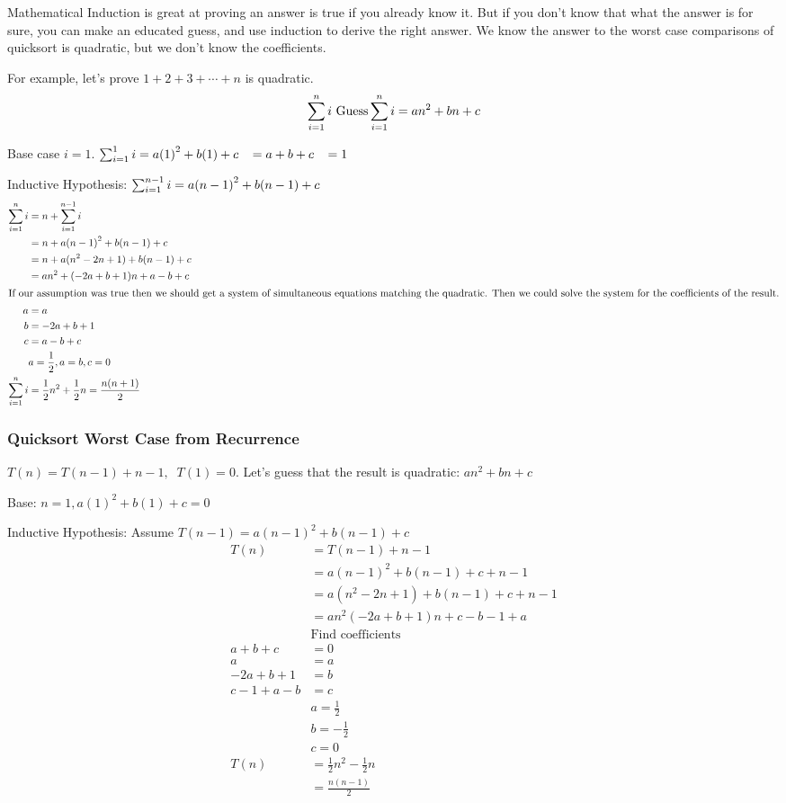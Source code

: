 \documentclass[english, 10pt]{article}
\begin{document}
Mathematical Induction is great at proving an answer is true if you already
know it. But if you don't know that what the answer is for sure, you can make
an educated guess, and use induction to derive the right answer. We know the
answer to the worst case comparisons of quicksort is quadratic, but we don't
know the coefficients.

For example, let's prove $1+2+3+\cdots+n$ is quadratic.
$$ \sum_{i=1}^{n} i \text{    Guess} \sum_{i=1}^{n} i = an^2 +bn +c $$

Base case $i=1$. $\sum_{i=1}^{1} i = a{(1)}^2 + b(1) +c \;\;\;= a+b+c \;\;\;= 1$

Inductive Hypothesis: $\sum_{i=1}^{n-1} i = a{(n-1)}^2 + b(n-1) +c$
\begin{align*}
    \sum_{i=1}^{n}i &= n + \sum_{i=1}^{n-1} i \\
    &= n + a{(n-1)}^2 + b(n-1) + c \\
    &= n + a(n^2 -2n +1) +b(n-1) +c \\
    &= an^2 +(-2a+b+1)n +a-b+c \\
    \intertext{If our assumption was true then we should get a system of
    simultaneous equations matching the quadratic. Then we could solve
    the system for the coefficients of the result.}
    a &= a \\
    b &= -2a+b+1 \\
    c &= a-b+c \\
    &a=\frac{1}{2}, a=b, c=0 \\
    \sum_{i=1}^{n}i &= \frac{1}{2}n^2 + \frac{1}{2}n = \frac{n(n+1)}{2}
\end{align*}

\subsubsection{Quicksort Worst Case from Recurrence}
$T(n) = T(n-1)+n-1, \;\;T(1)=0$. Let's guess that the result is quadratic:
$an^2+bn+c$

Base: $n=1 , a{(1)}^2+b(1)+c=0$

Inductive Hypothesis: Assume $T(n-1) = a{(n-1)}^2+b(n-1)+c$
\begin{align*}
    T(n)&= T(n-1)+n-1 \\
        &= a{(n-1)}^2+b(n-1)+c +n -1 \\
        &= a(n^2 -2n +1) +b(n-1) +c +n-1 \\
        &= an^2 (-2a +b +1)n +c-b-1+a \\
        &\text{Find coefficients} \\
        a+b+c&=0 \\
        a&=a \\
        -2a+b+1&=b \\
        c-1+a-b&=c \\
        &a=\frac{1}{2}\\
        &b=-\frac{1}{2}\\
        &c=0\\
    T(n)&=\frac{1}{2}n^2 - \frac{1}{2}n \\
        &= \frac{n(n-1)}{2}
\end{align*}
\end{document}
